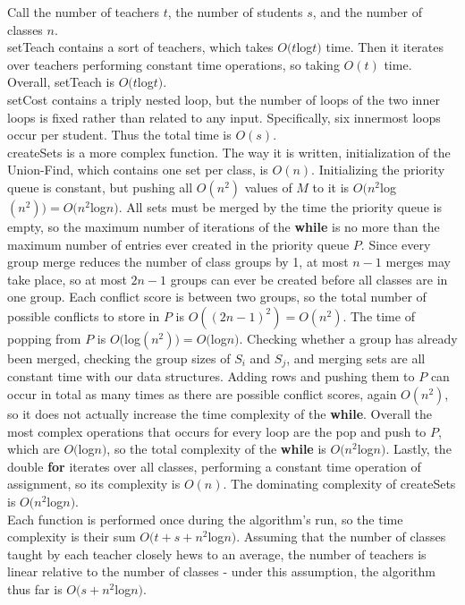 \documentclass[11pt, oneside]{article}   	%
\begin{document}
Call the number of teachers $t$, the number of students $s$, and the number of classes $n$. \\

 setTeach contains a sort of teachers, which takes $O(t$log$t)$ time. Then it iterates over teachers performing constant time operations, so taking $O(t)$ time. Overall, setTeach is $O(t$log$t)$. \\

 setCost contains a triply nested loop, but the number of loops of the two inner loops is fixed rather than related to any input. Specifically, six innermost loops occur per student. Thus the total time is $O(s)$. \\

 createSets is a more complex function. The way it is written, initialization of the Union-Find, which contains one set per class, is $O(n)$. Initializing the priority queue is constant, but pushing all $O(n^2)$ values of $M$ to it is $O(n^2$log$(n^2)) = O(n^2$log$n)$. All sets must be merged by the time the priority queue is empty, so the maximum number of iterations of the \textbf{while} is no more than the maximum number of entries ever created in the priority queue $P$. Since every group merge reduces the number of class groups by 1, at most $n-1$ merges may take place, so at most $2n-1$ groups can ever be created before all classes are in one group. Each conflict score is between two groups, so the total number of possible conflicts to store in $P$ is $O((2n-1)^2) = O(n^2)$. The time of popping from $P$ is $O($log$(n^2)) = O($log$n)$. Checking whether a group has already been merged, checking the group sizes of $S_i$ and $S_j$, and merging sets are all constant time with our data structures. Adding rows and pushing them to $P$ can occur in total as many times as there are possible conflict scores, again $O(n^2)$, so it does not actually increase the time complexity of the \textbf{while}. Overall the most complex operations that occurs for every loop are the pop and push to $P$, which are $O($log$n)$, so the total complexity of the \textbf{while} is $O(n^2$log$n)$. Lastly, the double \textbf{for} iterates over all classes, performing a constant time operation of assignment, so its complexity is $O(n)$. The dominating complexity of createSets is $O(n^2$log$n)$. \\

 Each function is performed once during the algorithm's run, so the time complexity is their sum $O(t+s+n^2$log$n)$. Assuming that the number of classes taught by each teacher closely hews to an average, the number of teachers is linear relative to the number of classes - under this assumption, the algorithm thus far is $O(s + n^2$log$n)$.
 
\end{document}
